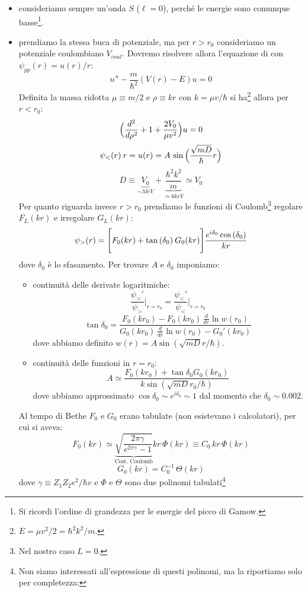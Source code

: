 \begin{itemize}
    \item consideriamo sempre un'onda $S$ ($\ell=0$), perché le energie sono comunque basse\footnote{Si ricordi l'ordine di grandezza per le energie del picco di Gamow.}.
    \item prendiamo la stessa buca di potenziale, ma per $r>r_0$ consideriamo un potenziale coulombiano $V_{coul}$. Dovremo risolvere allora l'equazione di \Sch{} con $\psi_{pp} (r) = u(r)/r$:
    $$u'' - \frac{m}{\hbar^2} (V(r) - E)u =0$$
    Definita la massa ridotta $\mu\equiv m/2$ e $\rho\equiv kr$ con $k=\mu v /\hbar$ si ha\footnote{$E=\mu v^2/2 = \hbar^2 k^2/m$.} allora per $r<r_0$:
    $$\Bigl ( \frac{d^2}{d\rho^2} + 1 + \frac{2V_0}{\mu v^2} \Bigr )u=0$$
    $$\psi_< (r) \: r = u(r) = A \, \sin{\Bigl ( \frac{\sqrt{mD}}{\hbar} r \Bigr )} $$
    $$ D \equiv \underbrace{V_0}_{\sim\unit{MeV}} + \underbrace{\frac{\hbar^2k^2}{m}}_{\simeq 6\unit{keV}} \simeq V_0 $$
    Per quanto riguarda invece $r>r_0$ prendiamo le funzioni di Coulomb\footnote{Nel nostro caso $L=0$.} regolare $F_L(kr)$ e irregolare $G_L(kr)$:
    $$\psi_>(r) = \Biggl [ F_0 (kr) + \tan{(\delta_0)}\:G_0(kr) \Biggr ]\frac{e^{i\delta_0}\cos{(\delta_0)}}{kr}$$
    dove $\delta_0$ è lo sfasamento. Per trovare $A$ e $\delta_0$ imponiamo:
    \begin{itemize}
        \item continuità delle derivate logaritmiche:
        $$\frac{\psi_>'}{\psi_>}\Bigr |_{r=r_0} = \frac{\psi_<'}{\psi_<}\Bigr |_{r=r_0}$$
        $$\tan{\delta_0} = \frac{F_0(kr_0) - F_0(kr_0)\,\frac{d}{dr}\ln{w}(r_0)}{G_0(kr_0)\,\frac{d}{dr}\ln{w}(r_0) - G_0'(kr_0)}$$
        dove abbiamo definito $w(r) = A \sin{(\sqrt{mD}r/\hbar)}$.
        \item continuità delle funzioni in $r=r_0$:
        $$A \simeq \frac{F_0(kr_0)+\tan{\delta_0} G_0(kr_0)}{k\sin{(\sqrt{mD}r_0/\hbar)}}$$
        dove abbiamo approssimato $\cos{\delta_0}\sim e^{i\delta_0}\sim 1$ dal momento che $\delta_0\sim 0.002$.
    \end{itemize}
    Al tempo di Bethe $F_0$ e $G_0$ erano tabulate (non esistevano i calcolatori), per cui si aveva:
    $$F_0(kr)\simeq \underbrace{\sqrt{\frac{2\pi\gamma}{e^{2\pi\gamma}-1}}}_\text{Cost. Coulomb}kr\,\Phi(kr)\equiv C_0\, kr \, \Phi(kr) $$
    $$G_0(kr)=C_0^{-1} \, \Theta(kr)$$
    dove $\gamma \equiv Z_1Z_2e^2/\hbar v$ e $\Phi$ e $\Theta$ sono due polinomi tabulati\footnote{Non siamo interessati all'espressione di questi polinomi, ma la riportiamo solo per completezza:
}
\end{itemize}
